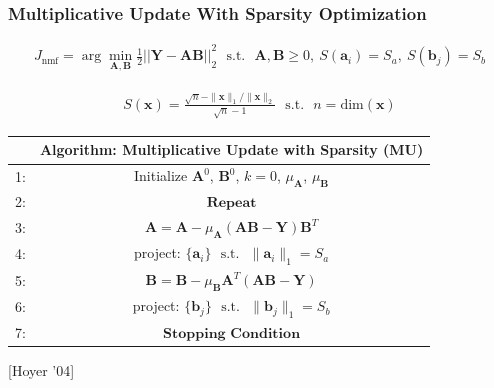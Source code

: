 \documentclass{beamer}
\begin{document}
\begin{frame}
\frametitle{Multiplicative Update With Sparsity Optimization}

	\begin{align*} 
		J_{\text{nmf}} = \arg\min_{\mathbf{A,B}} {\frac{1}{2}||\mathbf{Y} - \mathbf{A} \mathbf{B}||}_{2}^2  \ \ \    \text{s.t.} \ \ \ \mathbf{A}, \mathbf{B} \ge 0,\ S(\mathbf{a}_i) = S_a,\ S(\mathbf{b}_j) = S_b
	\end{align*}

	\begin{align*} 
		S(\mathbf{x}) = \frac{\sqrt{n} - \|\mathbf{x}\|_1 / \|\mathbf{x}\|_2}{\sqrt{n}-1}  \ \ \ \text{s.t.} \ \ \ n = \text{dim}(\mathbf{x})
	\end{align*}
	
	
\begin{table}[h]
      \label{tab:MU} 
\centering
  \begin{tabular}{c || c |  }
        \hline
              & Algorithm: Multiplicative Update with Sparsity (MU) \\ \hline \hline
    1: & Initialize  $\mathbf{A}^0$, $\mathbf{B}^0$, $k = 0$, $\mu_\mathbf{A}$, $\mu_\mathbf{B}$  \\ \hline
    2: & $\textbf{Repeat}$ \\ \hline
    3: &     $\mathbf{A} = \mathbf{A} - \mu_\mathbf{A}(\mathbf{A}\mathbf{B} - \mathbf{Y})\mathbf{B}^T$ \\ \hline
    4: &     project: $\{\mathbf{a}_i\}\ \ \ \text{s.t.} \ \ \ \|\mathbf{a}_i\|_1 = S_a$ \\ \hline
    5: &     $\mathbf{B} = \mathbf{B} - \mu_\mathbf{B}\mathbf{A}^T(\mathbf{A}\mathbf{B} - \mathbf{Y})$ \\ \hline
    6: &     project: $\{\mathbf{b}_j\}\ \ \ \text{s.t.} \ \ \ \|\mathbf{b}_j\|_1 = S_b$ \\ \hline
    7: & $\textbf{Stopping Condition}$ \\ \hline
    \hline
  \end{tabular}
\end{table}

[Hoyer '04]
\end{frame}
\end{document}
